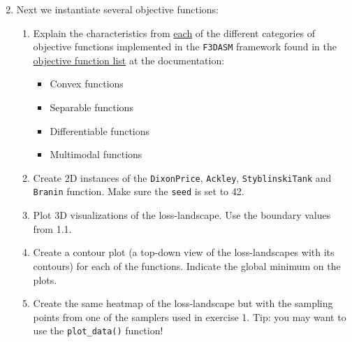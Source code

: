 \documentclass[10pt,a4paper,twoside]{article} %
\def\code#1{\texttt{#1}}
\begin{document}
\begin{enumerate}
	\setcounter{enumi}{1}
	\item Next we instantiate several objective functions:
	\begin{enumerate} [label*=\arabic*.]


		\item Explain the characteristics from \underline{each} of the different categories of objective functions implemented in the \code{F3DASM} framework found in the  \href{https://bessagroup.github.io/F3DASM/capabilities/functions.html\#implemented-benchmark-functions}{objective function list} at the documentation:
		\begin{itemize}
			\item Convex functions
			\item Separable functions
			\item Differentiable functions
			\item Multimodal functions
		\end{itemize}
	
	    \item Create 2D instances of the \code{DixonPrice}, \code{Ackley}, \code{StyblinskiTank} and \code{Branin} function. Make sure the \code{seed} is set to 42.
	
		\item Plot 3D visualizations of the loss-landscape. Use the boundary values from 1.1.
		\item Create a contour plot (a top-down view of the loss-landscapes with its contours) for each of the functions. Indicate the global minimum on the plots.
		\item Create the same heatmap of the loss-landscape but with the sampling points from one of the samplers used in exercise 1. Tip: you may want to use the \code{plot\_data()} function!
	
	\end{enumerate}
\end{enumerate}
\end{document}
